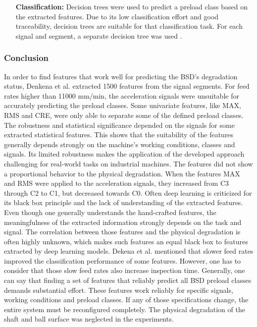 \begin{itemize}
    \item [\textbf{Classification:}] Decision trees were used to predict a preload class based on the extracted features. Due to its low classification effort and good traceability, decision trees are suitable for that classification task. For each signal and segment, a separate decision tree was used \cite{Denkena2021}. 
\end{itemize}

\subsubsection{Conclusion}
In order to find features that work well for predicting the BSD's degradation status, Denkena et al. \cite{Denkena2021} extracted 1500 features from the signal segments. For feed rates higher than 11000 mm/min, the acceleration signals were unsuitable for accurately predicting the preload classes. Some univariate features, like MAX, RMS and CRE, were only able to separate some of the defined preload classes. The robustness and statistical significance depended on the signals for some extracted statistical features. This shows that the suitability of the features generally depends strongly on the machine's working conditions, classes and signals.
Its limited robustness makes the application of the developed approach challenging for real-world tasks on industrial machines. The features did not show a proportional behavior to the physical degradation. When the features MAX and RMS were applied to the acceleration signals, they increased from C3 through C2 to C1, but decreased towards C0. Often deep learning is criticized for its black box principle and the lack of understanding of the extracted features. Even though one generally understands the hand-crafted features, the meaningfulness of the extracted information strongly depends on the task and signal. The correlation between those features and the physical degradation is often highly unknown, which makes such features an equal black box to features extracted by deep learning models. Dekena et al. \cite{Denkena2021} mentioned that slower feed rates improved the classification performance of some features. However, one has to consider that those slow feed rates also increase inspection time. Generally, one can say that finding a set of features that reliably predict all BSD preload classes demands substantial effort. These features work reliably for specific signals, working conditions and preload classes. If any of those specifications change, 
the entire system must be reconfigured completely. The physical degradation of the shaft and ball surface was neglected in the experiments.

